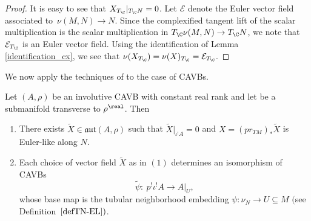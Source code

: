 \begin{proof}
   It is easy to see that $X_{T_{\C}}|_{T_{\C}N}=0$. Let $\mathcal{E}$ denote the Euler vector field associated to~${\nu(M,N)\rightarrow N}$. Since the complexified tangent lift of the scalar multiplication is the scalar multiplication in $T_{\C}\nu(M,N)\to T_{\C}N$, we note that $\mathcal{E}_{T_{\C}}$ is an Euler vector field. Using the identification of Lemma \ref{identification_cx}, we see that $\nu(X_{T_{\C}})=\nu(X)_{T_{\C}}=\mathcal{E}_{T_{\C}}$.
\end{proof}

We now apply the techniques of \cite{bursztyn2019splitting} to the case of CAVBs.
\begin{Proposition}\label{splitting_cavb}
Let $(A,\rho)$ be an involutive CAVB with constant real rank and let  be a submanifold transverse to $\rho^{\real}$. Then
\begin{enumerate}\itemsep=0pt
\item[$1.$] There exists $\widetilde{X}\in \mathfrak{aut}(A,\rho)$ such that $\widetilde{X}|_{\iota^! A}=0$ and $X={(pr_{TM})}_* \widetilde{X}$ is Euler-like along $N$.
\item[$2.$] Each choice of vector field $\widetilde{X}$ as in $(1)$ determines an isomorphism of CAVBs
\[
\widetilde{\psi}\colon\ p^! \iota^! A \to A|_U,
\]
whose base map is the tubular neighborhood embedding $\psi\colon \nu_N\to U\subseteq M$ $($see Definition~$\ref{defTN-EL})$.
\end{enumerate}
\end{Proposition}

